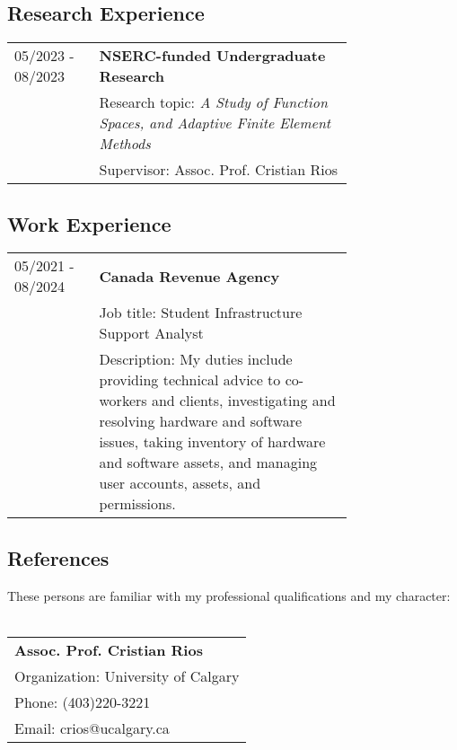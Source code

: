 \documentclass[12pt]{article}
\begin{document}
\subsection*{Research Experience}
\begin{tabular}{l p{0.75\linewidth}}
05/2023 - 08/2023&\textbf{NSERC-funded Undergraduate Research}\\
		      &Research topic: \textit{A Study of Function Spaces, and Adaptive Finite Element Methods}\\
		      &Supervisor: Assoc. Prof. Cristian Rios
\end{tabular}
\subsection*{Work Experience}
\begin{tabular}{l p{0.75\linewidth}}
05/2021 - 08/2024&\textbf{Canada Revenue Agency}\\
	            &Job title: Student Infrastructure Support Analyst\\
		    &Description: My duties include providing technical advice to co-workers and clients,
		     investigating and resolving hardware and software issues,
                     taking inventory of hardware and software assets, and managing user accounts, assets, and permissions.
\end{tabular}
\newpage
\subsection*{References}
These persons are familiar with my professional qualifications and my character:\\
\\
\begin{tabular}{l}
	\textbf{Assoc. Prof. Cristian Rios}\\
	Organization: University of Calgary\\
	Phone: (403)220-3221\\
	Email: crios@ucalgary.ca
\end{tabular}
\end{document}
